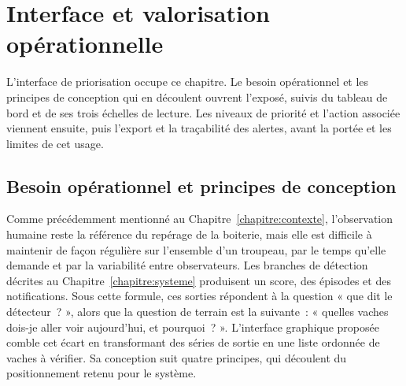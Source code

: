 \chapter{Interface et valorisation opérationnelle}
\label{chapitre:interface}

L'interface de priorisation occupe ce chapitre. Le besoin opérationnel et les principes de
conception qui en découlent ouvrent l'exposé, suivis du tableau de bord et de ses trois
échelles de lecture. Les niveaux de priorité et l'action associée viennent ensuite, puis
l'export et la traçabilité des alertes, avant la portée et les limites de cet usage.

\section{Besoin opérationnel et principes de conception}
Comme précédemment mentionné au Chapitre~\ref{chapitre:contexte}, l'observation humaine
reste la référence du repérage de la boiterie, mais elle est difficile
à maintenir de façon régulière sur l'ensemble d'un troupeau, par le temps qu'elle demande et
par la variabilité entre observateurs. Les branches de détection
décrites au Chapitre~\ref{chapitre:systeme} produisent un score, des épisodes et des
notifications. Sous cette formule, ces sorties répondent
à la question « que dit le détecteur~? », alors que la question de terrain est la suivante~:
« quelles vaches dois-je aller voir aujourd'hui, et pourquoi~? ». L'interface graphique
proposée comble cet écart en transformant des séries de sortie en une liste ordonnée de
vaches à vérifier. Sa conception suit quatre principes, qui découlent du positionnement
retenu pour le système.
